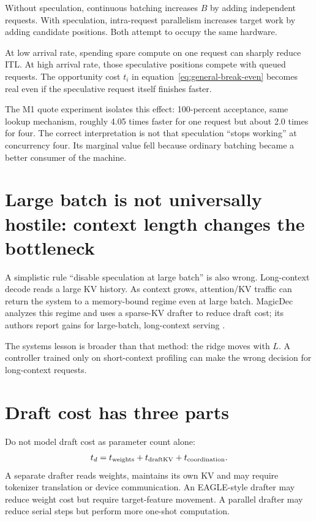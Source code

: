 Without speculation, continuous batching increases $B$ by adding independent requests.
With speculation, intra-request parallelism increases target work by adding candidate
positions. Both attempt to occupy the same hardware.

At low arrival rate, spending spare compute on one request can sharply reduce ITL. At
high arrival rate, those speculative positions compete with queued requests. The
opportunity cost $t_i$ in equation~\eqref{eq:general-break-even} becomes real even if
the speculative request itself finishes faster.

The M1 quote experiment isolates this effect: 100-percent acceptance, same lookup
mechanism, roughly 4.05 times faster for one request but about 2.0 times for four.
The correct interpretation is not that speculation ``stops working'' at concurrency
four. Its marginal value fell because ordinary batching became a better consumer of
the machine.

\section{Large batch is not universally hostile: context length changes the bottleneck}

A simplistic rule ``disable speculation at large batch'' is also wrong. Long-context
decode reads a large KV history. As context grows, attention/KV traffic can return the
system to a memory-bound regime even at large batch. MagicDec analyzes this regime and
uses a sparse-KV drafter to reduce draft cost; its authors report gains for large-batch,
long-context serving \cite{sadhukhan2024magicdec}.

The systems lesson is broader than that method: the ridge moves with $L$. A controller
trained only on short-context profiling can make the wrong decision for long-context
requests.

\section{Draft cost has three parts}

Do not model draft cost as parameter count alone:
\[
t_d=t_{\rm weights}+t_{\rm draftKV}+t_{\rm coordination}.
\]
A separate drafter reads weights, maintains its own KV and may require tokenizer
translation or device communication. An EAGLE-style drafter may reduce weight cost but
require target-feature movement. A parallel drafter may reduce serial steps but perform
more one-shot computation.


